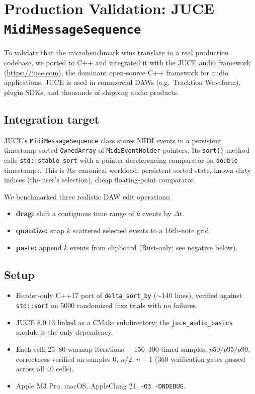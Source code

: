 \section{Production Validation: JUCE \texttt{MidiMessageSequence}}
\label{sec:juce}

To validate that the microbenchmark wins translate to a real production
codebase, we ported \DeltaSort to C++ and integrated it with the JUCE
audio framework (\url{https://juce.com}), the dominant open-source C++
framework for audio applications. JUCE is used in commercial DAWs (e.g.\
Tracktion Waveform), plugin SDKs, and thousands of shipping audio products.

\subsection{Integration target}

JUCE's \texttt{MidiMessageSequence} class stores MIDI events in a
persistent timestamp-sorted \texttt{OwnedArray} of \texttt{MidiEventHolder}
pointers. Its \texttt{sort()} method calls \texttt{std::stable\_sort} with a
pointer-dereferencing comparator on \texttt{double} timestamps. This is
\emph{the} canonical \DeltaSort workload: persistent sorted state, known
dirty indices (the user's selection), cheap floating-point comparator.

We benchmarked three realistic DAW edit operations:
\begin{itemize}
  \item \textbf{drag:} shift a contiguous time range of $k$ events by
        $\Delta t$.
  \item \textbf{quantize:} snap $k$ scattered selected events to a
        16th-note grid.
  \item \textbf{paste:} append $k$ events from clipboard
        (Rust-only; see negative below).
\end{itemize}

\subsection{Setup}

\begin{itemize}
  \item Header-only C++17 port of \texttt{delta\_sort\_by} ($\sim$140 lines),
        verified against \texttt{std::sort} on 5000 randomized fuzz trials
        with no failures.
  \item JUCE 8.0.13 linked as a CMake subdirectory; the
        \texttt{juce\_audio\_basics} module is the only dependency.
  \item Each cell: 25--80 warmup iterations + 150--300 timed samples,
        $p50/p95/p99$, correctness verified on samples 0, $n/2$, $n-1$
        (360 verification gates passed across all 40 cells).
  \item Apple M3 Pro, macOS, AppleClang 21, \texttt{-O3 -DNDEBUG}.
\end{itemize}

